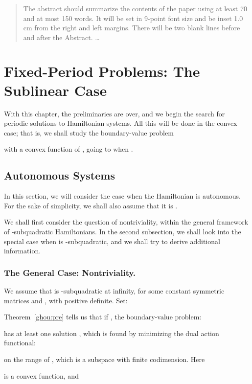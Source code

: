 \documentclass{llncs}
\begin{document}
\maketitle              
\begin{abstract}
The abstract should summarize the contents of the paper
using at least 70 and at most 150 words. It will be set in 9-point
font size and be inset 1.0 cm from the right and left margins.
There will be two blank lines before and after the Abstract. \dots
{}
\end{abstract}
\section{Fixed-Period Problems: The Sublinear Case}
With this chapter, the preliminaries are over, and we begin the search
for periodic solutions to Hamiltonian systems. All this will be done in
the convex case; that is, we shall study the boundary-value problem

with  a convex function of , going to  when
.

\subsection{Autonomous Systems}
In this section, we will consider the case when the Hamiltonian 
is autonomous. For the sake of simplicity, we shall also assume that it
is .

We shall first consider the question of nontriviality, within the
general framework of
-subquadratic Hamiltonians. In
the second subsection, we shall look into the special case when  is
-subquadratic,
and we shall try to derive additional information.
\subsubsection{The General Case: Nontriviality.}
We assume that  is
-sub\-qua\-dra\-tic at infinity,
for some constant symmetric matrices  and ,
with  positive definite. Set:


Theorem~\ref{ghou:pre} tells us that if , the
boundary-value problem:

has at least one solution
, which is found by minimizing the dual
action functional:

on the range of , which is a subspace 
with finite codimension. Here

is a convex function, and
\end{document}
